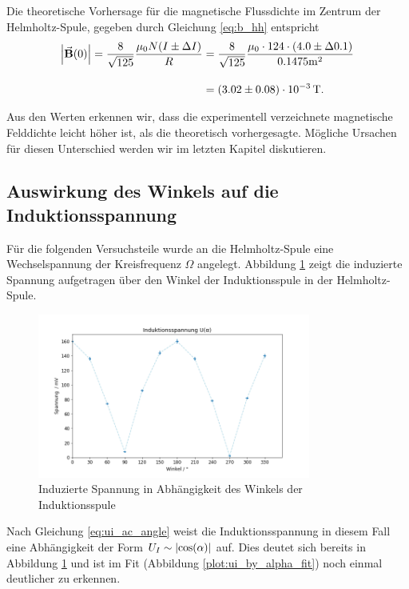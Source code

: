 Die theoretische Vorhersage für die magnetische Flussdichte im Zentrum der Helmholtz-Spule, gegeben durch Gleichung \ref{eq:b_hh} entspricht
\begin{align}
    \qty|\va{B}(0)| = \frac{8}{\sqrt{125}} \frac{\mu_0 N (I \pm \Delta I)}{R} &= \frac{8}{\sqrt{125}} \frac{\mu_0 \cdot  124 \cdot (4.0 \pm \Delta 0.1)}{0.1475 \si{m^2}}\\[1em]
    &= (3.02 \pm 0.08) \cdot 10^{-3}\, \si{T}.
\end{align}

Aus den Werten erkennen wir, dass die experimentell verzeichnete magnetische Felddichte leicht höher ist, als die theoretisch vorhergesagte. Mögliche Ursachen für diesen Unterschied werden wir im letzten Kapitel diskutieren.

\subsection{Auswirkung des Winkels auf die Induktionsspannung}

Für die folgenden Versuchsteile wurde an die Helmholtz-Spule eine Wechselspannung der Kreisfrequenz $\Omega$ angelegt. Abbildung \ref{plot:ui_by_alpha} zeigt die induzierte Spannung aufgetragen über den Winkel der Induktionsspule in der Helmholtz-Spule.

\begin{figure}[H]
    \centering
    \includegraphics[width=0.8\textwidth]{files/ui_by_alpha.png}
    \caption{Induzierte Spannung in Abhängigkeit des Winkels der Induktionsspule}
    \label{plot:ui_by_alpha}
\end{figure}

Nach Gleichung \ref{eq:ui_ac_angle} weist die Induktionsspannung in diesem Fall eine Abhängigkeit der Form $U_I \sim \qty|\cos(\alpha)|$ auf. Dies deutet sich bereits in Abbildung \ref{plot:ui_by_alpha} und ist im Fit (Abbildung \ref{plot:ui_by_alpha_fit}) noch einmal deutlicher zu erkennen.

